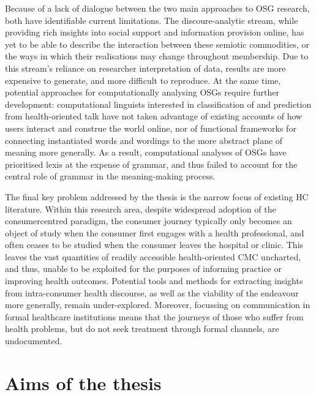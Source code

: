 Because of a lack of dialogue between the two main approaches to \gls{OSG} research, both have identifiable current limitations. The discoure\hyp{}analytic stream, while providing rich insights into social support and information provision online, has yet to be able to describe the interaction between these semiotic commodities, or the ways in which their  realisations may change throughout membership. Due to this stream's reliance on researcher interpretation of data, results are more expensive to generate, and more difficult to reproduce. At the same time, potential approaches for computationally analysing \glspl{OSG} require further development: computational linguists interested in classification of and prediction from health\hyp{}oriented talk have not taken advantage of existing accounts of how users interact and construe the world online, nor of functional frameworks for connecting instantiated words and wordings to the more abstract plane of meaning more generally. As a result, computational analyses of \glspl{OSG} have prioritised lexis at the expense of grammar, and thus failed to account for the central role of grammar in the meaning\hyp{}making process. %

The final key problem addressed by the thesis is the narrow focus of existing \gls{HC} literature. Within this research area, despite widespread adoption of the \gls{consumercentred} paradigm, the consumer journey typically only becomes an object of study when the consumer first engages with a health professional, and often ceases to be studied when the consumer leaves the hospital or clinic. This leaves the vast quantities of readily accessible health\hyp{}oriented \gls{CMC} uncharted, and thus, unable to be exploited for the purposes of informing practice or improving health outcomes. Potential tools and methods for extracting insights from intra\hyp{}consumer health discourse, as well as the viability of the endeavour more generally, remain under\hyp{}explored. Moreover, focussing on communication in formal healthcare institutions means that the journeys of those who suffer from health problems, but do not seek treatment through formal channels, are undocumented.

\section{Aims of the thesis}

